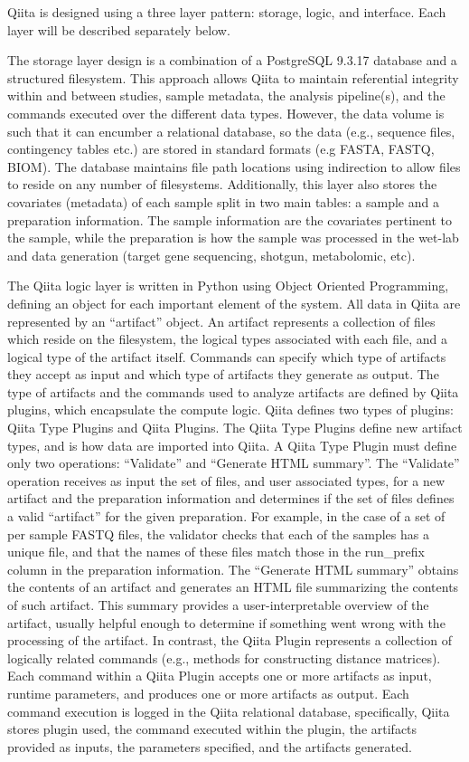 Qiita is designed using a three layer pattern: storage, logic, and interface. Each
layer will be described separately below.

The storage layer design is a combination of a PostgreSQL 9.3.17 database and a
structured filesystem. This approach allows Qiita to maintain referential integrity
within and between studies, sample metadata, the analysis pipeline(s), and the
commands executed over the different data types. However, the data volume is such
that it can encumber a relational database, so the data (e.g., sequence files,
contingency tables etc.) are stored in standard formats (e.g FASTA, FASTQ, BIOM).
The database maintains file path locations using indirection to allow files to
reside on any number of filesystems. Additionally, this layer also stores the covariates
(metadata) of each sample split in two main tables: a sample and a preparation
information. The sample information are the covariates pertinent to the sample,
while the preparation is how the sample was processed in the wet-lab and data
generation (target gene sequencing, shotgun, metabolomic, etc).

The Qiita logic layer is written in Python using Object Oriented Programming,
defining an object for each important element of the system. All data in Qiita
are represented by an “artifact” object. An artifact represents a collection of
files which reside on the filesystem, the logical types associated with each file,
and a logical type of the artifact itself. Commands can specify which type of
artifacts they accept as input and which type of artifacts they generate as output.
The type of artifacts and the commands used to analyze artifacts are defined by
Qiita plugins, which encapsulate the compute logic. Qiita defines two types of
plugins: Qiita Type Plugins and Qiita Plugins. The Qiita Type Plugins define new
artifact types, and is how data are imported into Qiita. A Qiita Type Plugin must
define only two operations: “Validate” and “Generate HTML summary”. The “Validate”
operation receives as input the set of files, and user associated types, for a new
artifact and the preparation information and determines if the set of files defines
a valid “artifact” for the given preparation. For example, in the case of a set of per
sample FASTQ files, the validator checks that each of the samples has a unique file,
and that the names of these files match those in the run\_prefix column in the preparation
information. The “Generate HTML summary” obtains the contents of an artifact and
generates an HTML file summarizing the contents of such artifact. This summary provides
a user-interpretable overview of the artifact, usually helpful enough to determine
if something went wrong with the processing of the artifact. In contrast, the Qiita
Plugin represents a collection of logically related commands (e.g., methods for
constructing distance matrices). Each command within a Qiita Plugin accepts one
or more artifacts as input, runtime parameters, and produces one or more artifacts
as output. Each command execution is logged in the Qiita relational database,
specifically, Qiita stores plugin used, the command executed within the plugin,
the artifacts provided as inputs, the parameters specified, and the artifacts generated.

